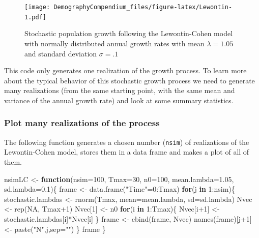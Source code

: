 \documentclass[
]{book}
\newenvironment{Shaded}{\begin{snugshade}}{\end{snugshade}}
\newcommand{\AttributeTok}[1]{\textcolor[rgb]{0.77,0.63,0.00}{#1}}
\newcommand{\ConstantTok}[1]{\textcolor[rgb]{0.00,0.00,0.00}{#1}}
\newcommand{\ControlFlowTok}[1]{\textcolor[rgb]{0.13,0.29,0.53}{\textbf{#1}}}
\newcommand{\DecValTok}[1]{\textcolor[rgb]{0.00,0.00,0.81}{#1}}
\newcommand{\FloatTok}[1]{\textcolor[rgb]{0.00,0.00,0.81}{#1}}
\newcommand{\FunctionTok}[1]{\textcolor[rgb]{0.00,0.00,0.00}{#1}}
\newcommand{\NormalTok}[1]{#1}
\newcommand{\OtherTok}[1]{\textcolor[rgb]{0.56,0.35,0.01}{#1}}
\newcommand{\SpecialCharTok}[1]{\textcolor[rgb]{0.00,0.00,0.00}{#1}}
\newcommand{\StringTok}[1]{\textcolor[rgb]{0.31,0.60,0.02}{#1}}
\begin{document}
\begin{figure}
\centering
\texttt{[image: DemographyCompendium\_files/figure-latex/Lewontin-1.pdf]}
\caption{\label{fig:Lewontin}Stochastic population growth following the Lewontin-Cohen model with normally distributed annual growth rates with mean \(\lambda=1.05\) and standard deviation \(\sigma=.1\)}
\end{figure}

This code only generates one realization of the growth process. To learn more about the typical behavior of this stochastic growth process we need to generate many realizations (from the same starting point, with the same mean and variance of the annual growth rate) and look at some summary statistics.

\hypertarget{plot-many-realizations-of-the-process}{%
\subsubsection*{Plot many realizations of the process}\label{plot-many-realizations-of-the-process}}

The following function generates a chosen number (\texttt{nsim}) of realizations of the Lewontin-Cohen model, stores them in a data frame and makes a plot of all of them.

\begin{Shaded}
\begin{Highlighting}[]
\NormalTok{nsimLC }\OtherTok{\textless{}{-}} \ControlFlowTok{function}\NormalTok{(}\AttributeTok{nsim=}\DecValTok{100}\NormalTok{, }\AttributeTok{Tmax=}\DecValTok{30}\NormalTok{, }\AttributeTok{n0=}\DecValTok{100}\NormalTok{, }\AttributeTok{mean.lambda=}\FloatTok{1.05}\NormalTok{, }\AttributeTok{sd.lambda=}\FloatTok{0.1}\NormalTok{)\{}
\NormalTok{  frame }\OtherTok{\textless{}{-}}  \FunctionTok{data.frame}\NormalTok{(}\StringTok{"Time"}\OtherTok{=}\DecValTok{0}\SpecialCharTok{:}\NormalTok{Tmax)}
  \ControlFlowTok{for}\NormalTok{(j }\ControlFlowTok{in} \DecValTok{1}\SpecialCharTok{:}\NormalTok{nsim)\{}
\NormalTok{  stochastic.lambdas }\OtherTok{\textless{}{-}} \FunctionTok{rnorm}\NormalTok{(Tmax, }\AttributeTok{mean=}\NormalTok{mean.lambda, }\AttributeTok{sd=}\NormalTok{sd.lambda)}
\NormalTok{  Nvec }\OtherTok{\textless{}{-}} \FunctionTok{rep}\NormalTok{(}\ConstantTok{NA}\NormalTok{, Tmax}\SpecialCharTok{+}\DecValTok{1}\NormalTok{)}
\NormalTok{  Nvec[}\DecValTok{1}\NormalTok{] }\OtherTok{\textless{}{-}}\NormalTok{ n0}
  \ControlFlowTok{for}\NormalTok{(i }\ControlFlowTok{in} \DecValTok{1}\SpecialCharTok{:}\NormalTok{Tmax)\{}
\NormalTok{    Nvec[i}\SpecialCharTok{+}\DecValTok{1}\NormalTok{] }\OtherTok{\textless{}{-}}\NormalTok{ stochastic.lambdas[i]}\SpecialCharTok{*}\NormalTok{Nvec[i]}
\NormalTok{  \}}
\NormalTok{  frame }\OtherTok{\textless{}{-}} \FunctionTok{cbind}\NormalTok{(frame, Nvec)}
  \FunctionTok{names}\NormalTok{(frame)[j}\SpecialCharTok{+}\DecValTok{1}\NormalTok{] }\OtherTok{\textless{}{-}} \FunctionTok{paste}\NormalTok{(}\StringTok{"N"}\NormalTok{,j,}\AttributeTok{sep=}\StringTok{""}\NormalTok{)}
\NormalTok{  \}}
\NormalTok{  frame}
\NormalTok{\}}
\end{Highlighting}
\end{Shaded}
\end{document}
